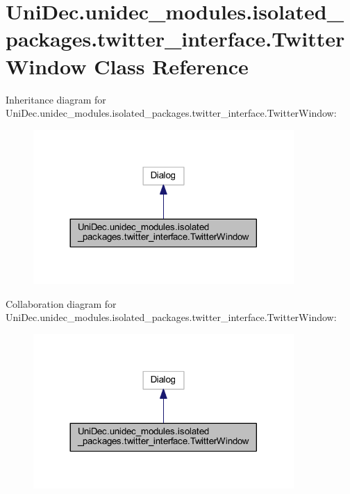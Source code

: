 \hypertarget{class_uni_dec_1_1unidec__modules_1_1isolated__packages_1_1twitter__interface_1_1_twitter_window}{}\section{Uni\+Dec.\+unidec\+\_\+modules.\+isolated\+\_\+packages.\+twitter\+\_\+interface.\+Twitter\+Window Class Reference}
\label{class_uni_dec_1_1unidec__modules_1_1isolated__packages_1_1twitter__interface_1_1_twitter_window}


Inheritance diagram for Uni\+Dec.\+unidec\+\_\+modules.\+isolated\+\_\+packages.\+twitter\+\_\+interface.\+Twitter\+Window\+:\nopagebreak
\begin{figure}[H]
\begin{center}
\leavevmode
\includegraphics[width=281pt]{class_uni_dec_1_1unidec__modules_1_1isolated__packages_1_1twitter__interface_1_1_twitter_window__inherit__graph}
\end{center}
\end{figure}


Collaboration diagram for Uni\+Dec.\+unidec\+\_\+modules.\+isolated\+\_\+packages.\+twitter\+\_\+interface.\+Twitter\+Window\+:\nopagebreak
\begin{figure}[H]
\begin{center}
\leavevmode
\includegraphics[width=281pt]{class_uni_dec_1_1unidec__modules_1_1isolated__packages_1_1twitter__interface_1_1_twitter_window__coll__graph}
\end{center}
\end{figure}
